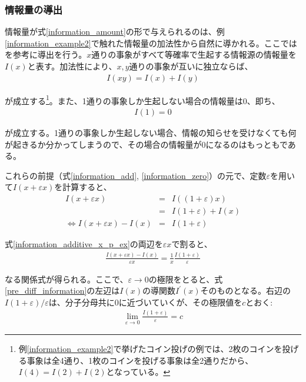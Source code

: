 \documentclass[uplatex,dvipdfmx,b5j,10pt]{jsbook}
\theoremstyle{definition}
\begin{document}
\subsubsection{情報量の導出}

情報量が式\ref{information_amount}の形で与えられるのは、例\ref{information_example2}で触れた情報量の加法性から自然に導かれる。ここでは\cite{amariinfo}を参考に導出を行う。$x$通りの事象がすべて等確率で生起する情報源の情報量を$I(x)$と表す。加法性により、$x,y$通りの事象が互いに独立ならば、
\begin{eqnarray}
  I(xy) = I(x) + I(y) \label{information_add}
\end{eqnarray}

が成立する\footnote{例\ref{information_example2}で挙げたコイン投げの例では、2枚のコインを投げる事象は全4通り、1枚のコインを投げる事象は全2通りだから、$I(4) = I(2) + I(2)$となっている。}。また、1通りの事象しか生起しない場合の情報量は0、即ち、
\begin{eqnarray}
  I(1) = 0  \label{information_zero}
\end{eqnarray}

が成立する。1通りの事象しか生起しない場合、情報の知らせを受けなくても何が起きるか分かってしまうので、その場合の情報量が0になるのはもっともである。

これらの前提（式\ref{information_add}, \ref{information_zero}）の元で、定数$\varepsilon$を用いて$I(x+\varepsilon x)$を計算すると、
\begin{eqnarray}
  I(x + \varepsilon x) &=& I((1 + \varepsilon) x) \nonumber \\
  &=& I(1 + \varepsilon) + I(x) \nonumber \\
  \iff I(x + \varepsilon x) - I(x) &=& I(1 + \varepsilon) \label{information_additive_x_p_ex}
\end{eqnarray}

式\ref{information_additive_x_p_ex}の両辺を$\varepsilon x$で割ると、
\begin{eqnarray}
  \frac{I(x + \varepsilon x) - I(x)}{\varepsilon x} = \frac{1}{x} \frac{I(1 + \varepsilon)}{\varepsilon} \label{pre_diff_information}
\end{eqnarray}

なる関係式が得られる。ここで、$\varepsilon \to 0$の極限をとると、式\ref{pre_diff_information}の左辺は$I(x)$の導関数$I^{\prime}(x)$そのものとなる。右辺の$I(1+\varepsilon)/\varepsilon$は、分子分母共に$0$に近づいていくが、その極限値を$c$とおく:
\begin{eqnarray*}
  \lim_{\varepsilon \to 0} \frac{I(1+\varepsilon)}{\varepsilon} = c
\end{eqnarray*}
\end{document}
